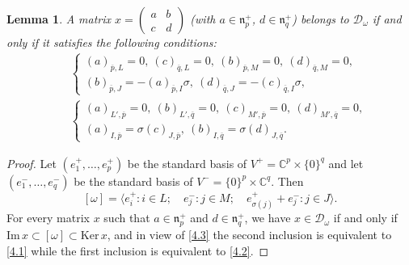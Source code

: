 \documentclass[11pt]{article}
\newtheorem{lemma}[theo]{Lemma}
\theoremstyle{definition}
\numberwithin{equation}{section}
\newcommand{\fn}{\mathfrak{n}}
\newcommand{\Span}[1]{\langle #1\rangle}
\newcommand{\subm}[2]{(#1)_{#2}}
\newcommand{\condir}{\mathcal{D}}
\newcommand{\intp}{\overline{p}}
\newcommand{\intq}{\overline{q}}
\newcommand{\mC}{\mathbb{C}}
\begin{document}
\begin{lemma}
\label{L4.2}
A matrix $x=\begin{pmatrix} a & b\\ c & d \end{pmatrix}$ \textup{(}with $a\in\fn_p^+$, $d\in\fn_q^+$\textup{)} belongs to $\mathcal{D}_\omega$ if and only if it satisfies the following conditions:
\begin{eqnarray}
&& \left\{\begin{array}{c} \subm{a}{\intp,L}=0,\ \subm{c}{\intq,L}=0,\ \subm{b}{\intp,M}=0,\ \subm{d}{\intq,M}=0,\\[1.5mm]
{} \subm{b}{\intp,J}=-\subm{a}{\intp,I}\sigma,\ \subm{d}{\intq,J}=-\subm{c}{\intq,I}\sigma, \end{array}\right. \label{4.1}\\[2mm]
&& \left\{\begin{array}{c} \subm{a}{L',\intp}=0,\ \subm{b}{L',\intq}=0,\ \subm{c}{M',\intp}=0,\ \subm{d}{M',\intq}=0,\\[1.5mm]
{} \subm{a}{I,\intp}=\sigma \subm{c}{J,\intp},\ \subm{b}{I,\intq}=\sigma\subm{d}{J,\intq}.
\end{array}\right. \label{4.2}
\end{eqnarray}
\end{lemma}

\begin{proof}
Let $(e_1^+,\ldots,e_p^+)$ be the standard basis of $V^+=\mC^p\times\{0\}^q$ and let $(e_1^-,\ldots,e_q^-)$ be the standard basis of $V^-=\{0\}^p\times\mC^q$. Then
\begin{equation}
\label{4.3}
[\omega]=\Span{e_i^+:i\in L;\quad e_j^-:j\in M;\quad e_{\sigma(j)}^++e_j^-:j\in J}.
\end{equation}
For every matrix $x$ such that $a\in\fn_p^+$ and $d\in\fn_q^+$, we have $x\in\condir_\omega$ if and only if $\mathrm{Im}\,x\subset[\omega]\subset \mathrm{Ker}\,x$, and in view of \eqref{4.3} the second inclusion is equivalent to \eqref{4.1} while the first inclusion is equivalent to \eqref{4.2}.
\end{proof}
\end{document}
